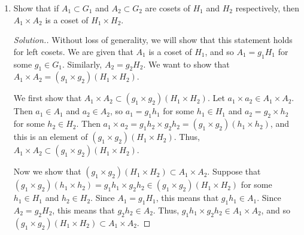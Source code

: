 \documentclass{article}
\newcommand{\sk}{\smallskip}
\begin{document}
\begin{enumerate}
\begin{enumerate}
\begin{proof}[Solution.]
            Now we show that for all $g_1 \times g_2 \in G_1 \times G_2$, $(g_1 \times g_2)(H_1 \times H_2) = (H_1 \times H_2)(g_1 \times g_2)$. Let $h_1 \times h_2$ be an arbitrary element of $H_1 \times H_2$ and let $g_1 \times g_2$ be an element of $G_1 \times G_2$. Then $(g_1 \times g_2)(h_1 \times h_2) = g_1h_1 \times g_2h_2$. Since $H_1$ is a normal subgroup, there exists an $h_1' \in H_1$ such that $g_1h_1 = h_1'g_1$, and since $H_1$ is a normal subgroup, there exists an $h_2' \in H_2$ such that $g_2h_2 = h_2'g_2$. Then, $h_1' \times h_2' \in H_1 \times H_2$, and $(g_1 \times g_2)(h_1 \times h_2) = (h_1' \times h_2')(g_1 \times g_2)$. This shows that $(g_1 \times g_2)(H_1 \times H_2) \subset (H_1 \times H_2)(g_1 \times g_2)$. The proof of the reverse direction is analogous, and so $g_1 \times g_2)(H_1 \times H_2) = (H_1 \times H_2)(g_1 \times g_2)$
        \end{proof}
        
        \item Show that if $A_1 \subset G_1$ and $A_2 \subset G_2$ are cosets of $H_1$ and $H_2$ respectively, then $A_1 \times A_2$ is a coset of $H_1 \times H_2$.

        \begin{proof}[Solution.]
            Without loss of generality, we will show that this statement holds for left cosets. We are given that $A_1$ is a coset of $H_1$, and so $A_1 = g_1H_1$ for some $g_1 \in G_1$. Similarly, $A_2 = g_2H_2$.  We want to show that $A_1 \times A_2 = (g_1 \times g_2)(H_1 \times H_2)$. 
            
            \sk
            
            We first show that $A_1 \times A_2 \subset (g_1 \times g_2)(H_1 \times H_2)$. Let $a_1 \times a_2 \in A_1 \times A_2$. Then $a_1 \in A_1$ and $a_2 \in A_2$, so $a_1 = g_1h_1$ for some $h_1 \in H_1$ and $a_2 = g_2 \times h_2$ for some $h_2 \in H_2$. Then $a_1 \times a_2 = g_1h_2 \times g_2h_2 = (g_1 \times g_2)(h_1 \times h_2)$, and this is an element of $(g_1 \times g_2)(H_1 \times H_2)$. Thus, $A_1 \times A_2 \subset (g_1 \times g_2)(H_1 \times H_2)$.

            \sk

            Now we show that $(g_1 \times g_2)(H_1 \times H_2) \subset A_1 \times A_2$. Suppose that $(g_1 \times g_2)(h_1 \times h_2) = g_1h_1 \times g_2h_2 \in (g_1 \times g_2)(H_1 \times H_2)$ for some $h_1 \in H_1$ and $h_2 \in H_2$. Since $A_1 = g_1H_1$, this means that $g_1h_1 \in A_1$. Since $A_2 = g_2H_2$, this means that $g_2h_2 \in A_2$. Thus, $g_1h_1 \times g_2h_2 \in A_1 \times A_2$, and so $(g_1 \times g_2)(H_1 \times H_2) \subset A_1 \times A_2$.


\end{proof}
\end{enumerate}
\end{enumerate}
\end{document}
